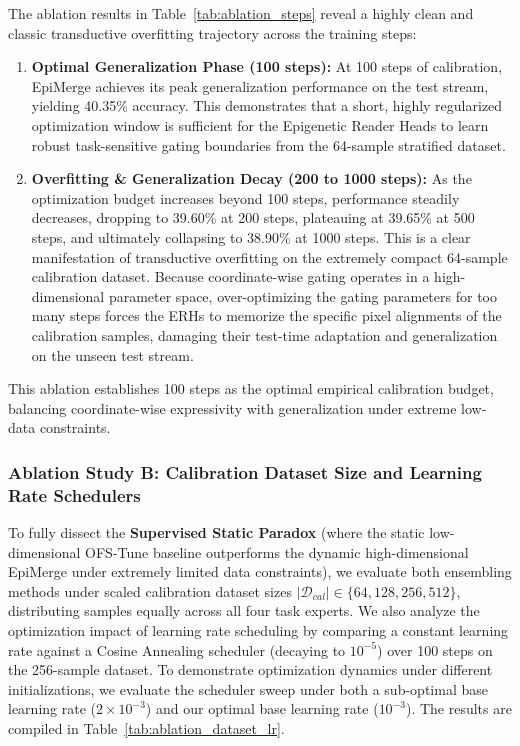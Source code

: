 The ablation results in Table~\ref{tab:ablation_steps} reveal a highly clean and classic transductive overfitting trajectory across the training steps:
\begin{enumerate}
    \item \textbf{Optimal Generalization Phase (100 steps):} At 100 steps of calibration, EpiMerge achieves its peak generalization performance on the test stream, yielding 40.35\% accuracy. This demonstrates that a short, highly regularized optimization window is sufficient for the Epigenetic Reader Heads to learn robust task-sensitive gating boundaries from the 64-sample stratified dataset.
    \item \textbf{Overfitting \& Generalization Decay (200 to 1000 steps):} As the optimization budget increases beyond 100 steps, performance steadily decreases, dropping to 39.60\% at 200 steps, plateauing at 39.65\% at 500 steps, and ultimately collapsing to 38.90\% at 1000 steps. This is a clear manifestation of transductive overfitting on the extremely compact 64-sample calibration dataset. Because coordinate-wise gating operates in a high-dimensional parameter space, over-optimizing the gating parameters for too many steps forces the ERHs to memorize the specific pixel alignments of the calibration samples, damaging their test-time adaptation and generalization on the unseen test stream.
\end{enumerate}
This ablation establishes 100 steps as the optimal empirical calibration budget, balancing coordinate-wise expressivity with generalization under extreme low-data constraints.

\subsubsection{Ablation Study B: Calibration Dataset Size and Learning Rate Schedulers}
To fully dissect the \textbf{Supervised Static Paradox} (where the static low-dimensional OFS-Tune baseline outperforms the dynamic high-dimensional EpiMerge under extremely limited data constraints), we evaluate both ensembling methods under scaled calibration dataset sizes $|\mathcal{D}_{cal}| \in \{64, 128, 256, 512\}$, distributing samples equally across all four task experts. We also analyze the optimization impact of learning rate scheduling by comparing a constant learning rate against a Cosine Annealing scheduler (decaying to $10^{-5}$) over 100 steps on the 256-sample dataset. To demonstrate optimization dynamics under different initializations, we evaluate the scheduler sweep under both a sub-optimal base learning rate ($2 \times 10^{-3}$) and our optimal base learning rate ($10^{-3}$). The results are compiled in Table~\ref{tab:ablation_dataset_lr}.

